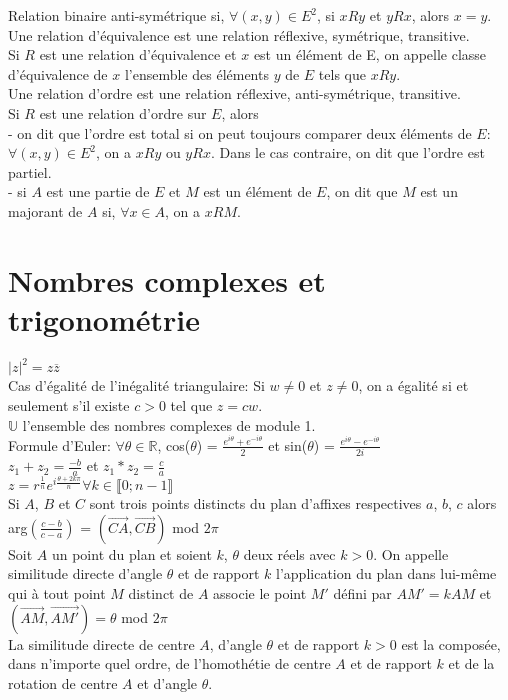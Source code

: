\documentclass{article}
\begin{document}
		Relation binaire anti-symétrique si, $\forall (x, y) \in E^2$, si $xRy$ et $yRx$, alors $x = y$.\\
		Une relation d'équivalence est une relation réflexive, symétrique, transitive.\\
		Si $R$ est une relation d'équivalence et $x$ est un élément de E, on appelle classe d'équivalence de $x$ l'ensemble des éléments $y$ de $E$ tels que $xRy$.\\
		Une relation d'ordre est une relation réflexive, anti-symétrique, transitive.\\
		
		Si $R$ est une relation d'ordre sur $E$, alors\\
		- on dit que l'ordre est total si on peut toujours comparer deux éléments de $E$: $\forall (x, y) \in E^2$, on a $xRy$ ou $yRx$. Dans le cas contraire, on dit que l'ordre est partiel.\\
		- si $A$ est une partie de $E$ et $M$ est un élément de $E$, on dit que $M$ est un majorant de $A$ si, $\forall x \in A$, on a $xRM$.
		
	\section{Nombres complexes et trigonométrie}

		$|z|^2 = z\overline{z}$\\
		Cas d'égalité de l'inégalité triangulaire: Si $w \neq 0$ et $z \neq 0$, on a égalité si et seulement s'il existe $c > 0$ tel que $z = cw$.\\
		$\mathbb{U}$ l'ensemble des nombres complexes de module 1.\\
		
		Formule d'Euler: $\forall \theta \in \mathbb{R}$, cos($\theta$) = $\frac{e^{i\theta} + e^{-i\theta}}{2}$ et sin($\theta$) = $\frac{e^{i\theta} - e^{-i\theta}}{2i}$\\
		$z_1 + z_2 = \frac{-b}{a}$ et $z_1 * z_2 = \frac{c}{a}$\\
		$z = r^{\frac{1}{n}}e^{i\frac{\theta + 2k\pi}{n}} \forall k \in \llbracket 0; n-1 \rrbracket$\\
		
		Si $A$, $B$ et $C$ sont trois points distincts du plan d'affixes respectives $a$, $b$, $c$ alors arg$\left(\frac{c-b}{c-a}\right)$ = $(\overrightarrow{CA}, \overrightarrow{CB})$ mod $2\pi$\\
		Soit $A$ un point du plan et soient $k$, $\theta$ deux réels avec $k > 0$. On appelle similitude directe d'angle $\theta$ et de rapport $k$ l'application du plan dans lui-même qui à tout point $M$ distinct de $A$ associe le point $M'$ défini par $AM' = kAM$ et $(\overrightarrow{AM}, \overrightarrow{AM'}) = \theta$ mod $2\pi$\\
		La similitude directe de centre $A$, d'angle $\theta$ et de rapport $k > 0$ est la composée, dans n'importe quel ordre, de l'homothétie de centre $A$ et de rapport $k$ et de la rotation de centre $A$ et d'angle $\theta$.\\
		
\end{document}
